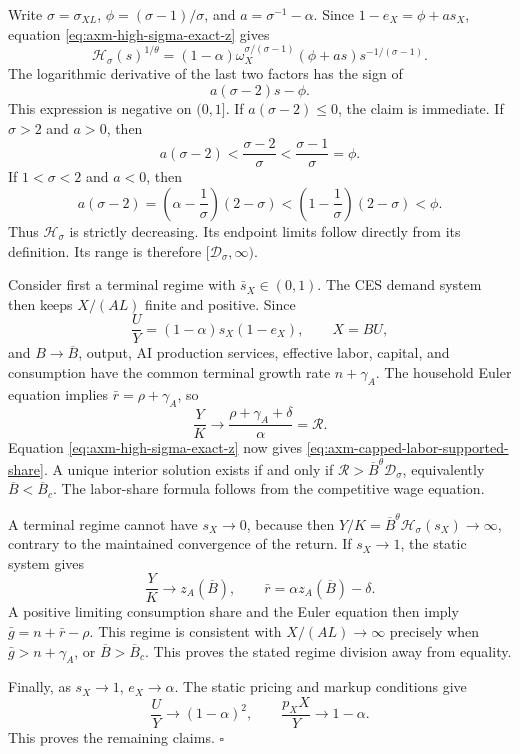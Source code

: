 Write \(\sigma=\sigma_{XL}\),
\(\phi=(\sigma-1)/\sigma\), and
\(a=\sigma^{-1}-\alpha\). Since
\(1-e_X=\phi+as_X\), equation
\eqref{eq:axm-high-sigma-exact-z} gives
\[
 \mathcal H_\sigma(s)^{1/\theta}
 =(1-\alpha)\omega_X^{\sigma/(\sigma-1)}
 (\phi+as)s^{-1/(\sigma-1)}.
\]
The logarithmic derivative of the last two factors has the sign of
\[
 a(\sigma-2)s-\phi.
\]
This expression is negative on \((0,1]\). If
\(a(\sigma-2)\leq0\), the claim is immediate. If \(\sigma>2\) and
\(a>0\), then
\[
 a(\sigma-2)<\frac{\sigma-2}{\sigma}
 <\frac{\sigma-1}{\sigma}=\phi.
\]
If \(1<\sigma<2\) and \(a<0\), then
\[
 a(\sigma-2)
 =\left(\alpha-\frac1\sigma\right)(2-\sigma)
 <\left(1-\frac1\sigma\right)(2-\sigma)<\phi.
\]
Thus \(\mathcal H_\sigma\) is strictly decreasing. Its endpoint limits
follow directly from its definition. Its range is therefore
\([\mathcal D_\sigma,\infty)\).

Consider first a terminal regime with \(\bar s_X\in(0,1)\). The CES demand
system then keeps \(X/(AL)\) finite and positive. Since
\[
 \frac{U}{Y}=(1-\alpha)s_X(1-e_X),\qquad X=BU,
\]
and \(B\to\overline B\), output, AI production services, effective labor,
capital, and consumption have the common terminal growth rate
\(n+\gamma_A\). The household Euler equation implies
\(\bar r=\rho+\gamma_A\), so
\[
 \frac{Y}{K}\to\frac{\rho+\gamma_A+\delta}{\alpha}
 =\mathcal R.
\]
Equation \eqref{eq:axm-high-sigma-exact-z} now gives
\eqref{eq:axm-capped-labor-supported-share}. A unique interior solution exists
if and only if
\(\mathcal R>\overline B^\theta\mathcal D_\sigma\), equivalently
\(\overline B<\overline B_c\). The labor-share formula follows from the
competitive wage equation.

A terminal regime cannot have \(s_X\to0\), because then
\(Y/K=\overline B^\theta\mathcal H_\sigma(s_X)\to\infty\), contrary to the
maintained convergence of the return. If \(s_X\to1\), the static system gives
\[
 \frac{Y}{K}\to z_A(\overline B),\qquad
 \bar r=\alpha z_A(\overline B)-\delta.
\]
A positive limiting consumption share and the Euler equation then imply
\(\bar g=n+\bar r-\rho\). This regime is consistent with
\(X/(AL)\to\infty\) precisely when
\(\bar g>n+\gamma_A\), or
\(\overline B>\overline B_c\). This proves the stated regime division away
from equality.

Finally, as \(s_X\to1\), \(e_X\to\alpha\). The static pricing and markup
conditions give
\[
 \frac{U}{Y}\to(1-\alpha)^2,\qquad
 \frac{p_XX}{Y}\to1-\alpha.
\]
This proves the remaining claims. \(\square\)

